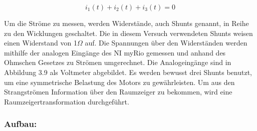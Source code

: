 \[i_1(t)+i_2(t)+i_3(t)=0\]


Um die Ströme zu messen, werden Widerstände, auch Shunts genannt, in Reihe zu den Wicklungen geschaltet. Die in diesem Versuch verwendeten Shunts weisen einen Widerstand von 1$\Omega$ auf. Die Spannungen über den Widerständen werden mithilfe der analogen Eingänge des NI myRio gemessen und anhand des Ohmschen Gesetzes zu Strömen umgerechnet. Die Analogeingänge sind in Abbildung 3.9 als Voltmeter abgebildet. Es werden bewusst drei Shunts benutzt, um eine symmetrische Belastung des Motors zu gewährleisten.
Um aus den Strangströmen Information über den Raumzeiger zu bekommen, wird eine Raumzeigertransformation durchgeführt.


\subsubsection{Aufbau:}


